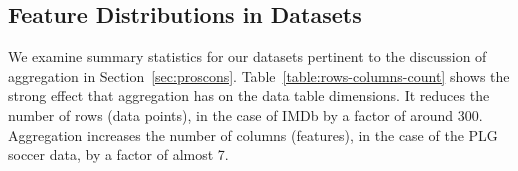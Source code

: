 \documentclass[conference]{IEEEtran}
\begin{document}
%


\subsection{Feature Distributions in Datasets}

We examine summary statistics for our datasets pertinent to the discussion of aggregation in Section~\ref{sec:proscons}. Table~\ref{table:rows-columns-count} shows the strong effect that aggregation has on the data table dimensions. It reduces the number of rows (data points), in the case of IMDb by a factor of around 300. Aggregation increases the number of columns (features), in the case of the PLG soccer data, by a factor of almost 7.

\begin{table}[ht]
\caption{Data Table Dimensions}
\centering
{}
\label{table:rows-columns-count}
\end{table}
\end{document}
